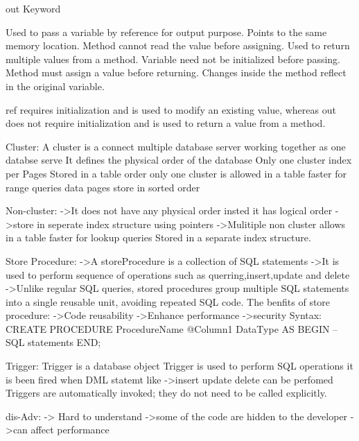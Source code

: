 out Keyword

                Used to pass a variable by reference for output purpose.
                Points to the same memory location.
                Method cannot read the value before assigning.
                Used to return multiple values from a method.
                Variable need not be initialized before passing.
                Method must assign a value before returning.
                Changes inside the method reflect in the original variable.

ref requires initialization and is used to modify an existing value, whereas out does not require initialization and is used to return a value from a method.

Cluster:
        A cluster is a connect multiple database server working together as one databse serve
        It defines the physical order of the database
        Only one cluster index per Pages
        Stored in a table order
        only one cluster is allowed in a table
        faster for range queries
        data pages store in sorted order



Non-cluster:
        ->It does not have any physical order insted it has logical order
        ->store in seperate index structure using pointers 
        ->Mulitiple non cluster allows in a table
        faster for lookup queries
        Stored in a separate index structure.


Store Procedure:
        ->A storeProcedure is a collection of SQL statements
        ->It is used to perform sequence of operations such as querring,insert,update and delete
        ->Unlike regular SQL queries, stored procedures group multiple SQL statements into a single reusable unit, avoiding repeated SQL code.
  The benfits of store procedure:
                ->Code reusability
                ->Enhance performance
                ->security
        Syntax:
                CREATE PROCEDURE ProcedureName
                @Column1 DataType
                AS
                BEGIN
                -- SQL statements
                END;

Trigger:
        Trigger is a database object 
        Trigger is used to perform SQL operations
        it is been fired when  DML statemt like ->insert update delete can be perfomed
       Triggers are automatically invoked; they do not need to be called explicitly.
        
  dis-Adv:
        -> Hard to understand
        ->some of the code are hidden to the developer
        ->can affect performance



